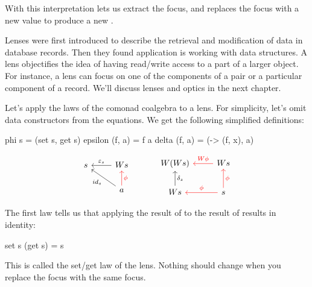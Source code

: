 \documentclass[DaoFP]{subfiles}
\begin{document}
With this interpretation  lets us extract the focus, and  replaces the focus with a new value to produce a new . 

Lenses were first introduced to describe the retrieval and modification of data in database records. Then they found application is working with data structures. A lens objectifies the idea of having read/write access to a part of a larger object. For instance, a lens can focus on one of the components of a pair or a particular component of a record. We'll discuss lenses and optics in the next chapter.

Let's apply the laws of the comonad coalgebra to a lens. For simplicity, let's omit data constructors from the equations. We get the following simplified definitions:
\begin{haskell}
phi s = (set s, get s)
epsilon (f, a) = f a
delta (f, a) = (\x -> (f, x), a)
\end{haskell}

\[
 \begin{tikzcd}
 s
 & W s
 \arrow[l, "\varepsilon_s"']
 \\
 & a
 \arrow[ul, "id_s"]
\arrow[u, red, "\phi"']
 \end{tikzcd}
  \hspace{30pt}
 \begin{tikzcd}
W(W s) 
&W s
\arrow[l, red, "W \phi "']
\\
W s
\arrow[u, "\delta_s"']
& s
\arrow[l, red, "\phi"']
\arrow[u, red, "\phi"']
 \end{tikzcd}
\]


The first law  tells us that applying the result of  to the result of  results in identity:
\begin{haskell}
set s (get  s) = s
\end{haskell}
This is called the set/get law of the lens. Nothing should change when you replace the focus with the same focus.
\end{document}
